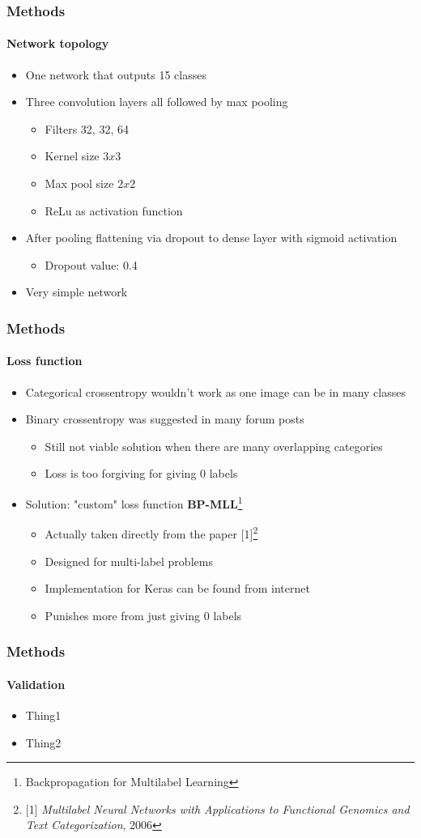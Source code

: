 \begin{frame}
	\frametitle{Methods}
	\framesubtitle{Network topology}
	\begin{itemize}
		\item One network that outputs 15 classes
		\item Three convolution layers all followed by max pooling
		\begin{itemize}
			\item Filters 32, 32, 64
			\item Kernel size $3 x 3$
			\item Max pool size $2 x 2$
			\item ReLu as activation function
		\end{itemize}
		\item After pooling flattening via dropout to dense layer with sigmoid activation
		\begin{itemize}
			\item Dropout value: 0.4
		\end{itemize}
		\item Very simple network
	\end{itemize}
\end{frame}

\begin{frame}
	\frametitle{Methods}
	\framesubtitle{Loss function}
	\begin{itemize}
		\item Categorical crossentropy wouldn't work as one image can be in many classes
		\item Binary crossentropy was suggested in many forum posts
			\begin{itemize}
				\item Still not viable solution when there are many overlapping categories
				\item Loss is too forgiving for giving 0 labels
			\end{itemize}
		\item Solution: "custom" loss function \textbf{BP-MLL}\footnote{Backpropagation for Multilabel Learning}
		\begin{itemize}
			\item Actually taken directly from the paper [1]\footnote{[1] \emph{Multilabel Neural Networks with Applications to Functional Genomics and Text Categorization}, 2006}
			\item Designed for multi-label problems
			\item Implementation for Keras can be found from internet
			\item Punishes more from just giving 0 labels
		\end{itemize}
	\end{itemize}
\end{frame}

\begin{frame}
	\frametitle{Methods}
	\framesubtitle{Validation}
	\begin{itemize}
		\item Thing1
		\item Thing2
	\end{itemize}
\end{frame}